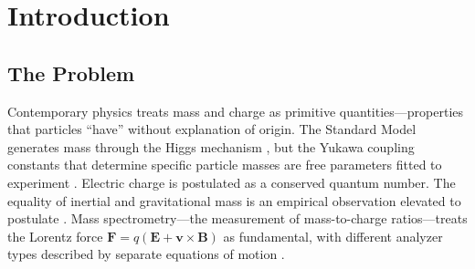\documentclass[twocolumn,10pt,a4paper]{article}
\theoremstyle{definition}
\theoremstyle{remark}
\newcommand{\Depth}{\mathcal{M}}
\newcommand{\Lagr}{\mathcal{L}}
\newcommand{\Apartition}{\mathbf{A}_{\mathcal{M}}}
\newcommand{\partinert}{\mu}
\newcommand{\taup}{\tau_p}
\begin{document}
\begin{abstract}
Finally, we construct the partition Lagrangian $\Lagr_{\Depth} = \frac{1}{2}\partinert|\dot{\mathbf{x}}|^2 + \partinert\dot{\mathbf{x}}\cdot\Apartition - \Depth(\mathbf{x}, t)$ with partition inertia $\partinert = \alpha(m/z)$, and derive the equations of motion for all four major mass analyzer types---time-of-flight ($T \propto \sqrt{m/z}$), quadrupole (Mathieu stability), Orbitrap ($\omega \propto \sqrt{z/m}$), and FT-ICR ($\omega_c \propto z/m$)---from this single Lagrangian. We derive chromatographic retention as partition lag ($t_R = \taup$), fragmentation selection rules ($\Delta\ell = \pm 1$, $\Delta m \in \{0, \pm 1\}$, $\Delta s = 0$), and the complete ion journey from injection to detection. We establish the fundamental identity $dM/dt = 1/\langle\taup\rangle$ connecting temporal evolution to partition state counting, and derive the partition uncertainty relation $\Delta\Depth \cdot \taup \geq \hbar$ yielding fundamental resolution limits. Experimental validation on 4,545 entries across four NIST reference libraries and 127,000 proteomic bijective transformations achieves 100\% conformance with partition state space constraints.

The complete derivation chain---from bounded phase space through oscillatory necessity, partition geometry, mass and charge emergence, to the experimentally validated mass spectrometer---proceeds with zero adjustable parameters.
\end{abstract}

\section{Introduction}
\label{sec:introduction}

\subsection{The Problem}

Contemporary physics treats mass and charge as primitive quantities---properties that particles ``have'' without explanation of origin. The Standard Model generates mass through the Higgs mechanism \citep{higgs1964,englert1964}, but the Yukawa coupling constants that determine specific particle masses are free parameters fitted to experiment \citep{atlas2012,cms2012}. Electric charge is postulated as a conserved quantum number. The equality of inertial and gravitational mass is an empirical observation elevated to postulate \citep{einstein1916,eotvos1922}. Mass spectrometry---the measurement of mass-to-charge ratios---treats the Lorentz force $\mathbf{F} = q(\mathbf{E} + \mathbf{v} \times \mathbf{B})$ as fundamental, with different analyzer types described by separate equations of motion \citep{gross2017}.
\end{document}
